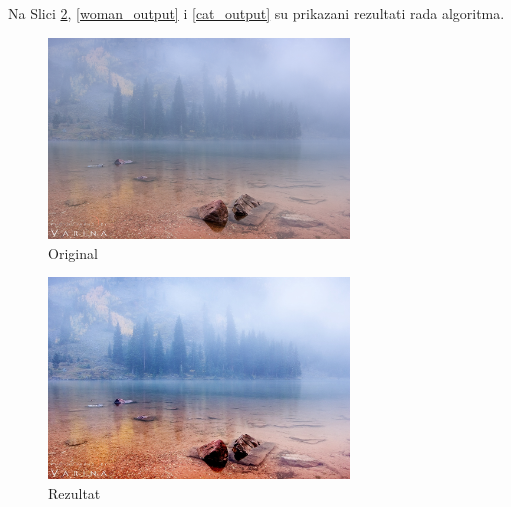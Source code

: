 \documentclass[12pt,a4paper]{article}
\theoremstyle{definition}
\theoremstyle{remark}
\theoremstyle{plain}
\begin{document}
Na Slici \ref{river_output}, \ref{woman_output} i \ref{cat_output} su prikazani rezultati rada algoritma.

\begin{multicols}{2}
\begin{figure}[H]
\centering
\includegraphics[width=8cm]{images/river.jpg}
  \caption{Original}\label{river}
\end{figure}
\columnbreak
\begin{figure}[H]
\centering
\includegraphics[width=8cm]{images/fuzzy_color_1.jpg}
  \caption{Rezultat}\label{river_output}
\end{figure}
\end{multicols}
\end{document}
